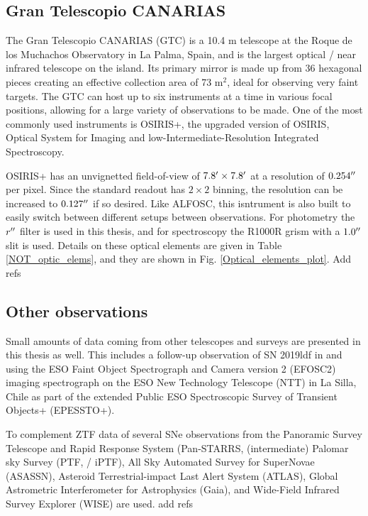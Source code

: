 \documentclass[a4paper,oneside,12pt, class=Latex/Classes/PhDthesisPSnPDF, crop=false]{standalone}
\begin{document}
\subsection{Gran Telescopio CANARIAS}
The Gran Telescopio CANARIAS (GTC) is a 10.4 m telescope at the Roque de los Muchachos Observatory in La Palma, Spain, and is the largest optical / near infrared telescope on the island. Its primary mirror is made up from 36 hexagonal pieces creating an effective collection area of 73 m$^2$, ideal for observing very faint targets. The GTC can host up to six instruments at a time in various focal positions, allowing for a large variety of observations to be made. One of the most commonly used instruments is OSIRIS+, the upgraded version of OSIRIS, Optical System for Imaging and low-Intermediate-Resolution Integrated Spectroscopy.

OSIRIS+ has an unvignetted field-of-view of $7.8^{\prime}\times7.8^{\prime}$ at a resolution of $0.254^{\prime\prime}$ per pixel. Since the standard readout has $2\times2$ binning, the resolution can be increased to $0.127^{\prime\prime}$ if so desired. Like ALFOSC, this isntrument is also built to easily switch between different setups between observations. For photometry the $r^{\prime\prime}$ filter is used in this thesis, and for spectroscopy the R1000R grism with a $1.0^{\prime\prime}$ slit is used. Details on these optical elements are given in Table \ref{NOT_optic_elems}, and they are shown in Fig. \ref{Optical_elements_plot}. \color{red} Add refs \color{black}


\subsection{Other observations}
Small amounts of data coming from other telescopes and surveys are presented in this thesis as well. This includes a follow-up observation of SN 2019ldf in \ztfg and \ztfr using the ESO Faint Object Spectrograph and Camera version 2 (EFOSC2) imaging spectrograph on the ESO New Technology Telescope (NTT) in La Silla, Chile as part of the extended Public ESO Spectroscopic Survey of Transient Objects+ (EPESSTO+).

To complement ZTF data of several SNe observations from the Panoramic Survey Telescope and Rapid Response System (Pan-STARRS, (intermediate) Palomar sky Survey (PTF, / iPTF), All Sky Automated Survey for SuperNovae (ASASSN), Asteroid Terrestrial-impact Last Alert System (ATLAS), Global Astrometric Interferometer for Astrophysics (Gaia), and Wide-Field Infrared Survey Explorer (WISE) are used. \color{red} add refs \color{black}
\end{document}
